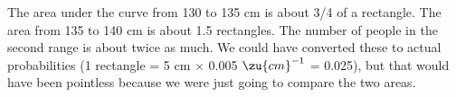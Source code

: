 The area under the curve from 130 to 135 cm is about 3/4 of a rectangle. The
 area from 135 to 140 cm is about 1.5 rectangles. The number of people in the
 second range is about twice as much. We could have converted these to actual
 probabilities (1 rectangle = 5 cm $\times$ 0.005 $\zu{cm}^{-1}$ = 0.025), but that
 would have been pointless because we were just going to compare the two areas.
